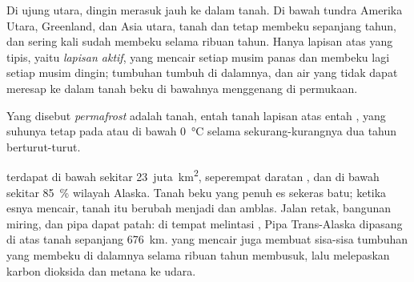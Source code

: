Di ujung utara, dingin merasuk jauh ke dalam tanah. Di bawah tundra
Amerika Utara, Greenland, dan Asia utara, tanah dan  tetap membeku
sepanjang tahun, dan sering kali sudah membeku selama ribuan tahun. Hanya
lapisan atas yang tipis, yaitu \emph{lapisan aktif}, yang mencair setiap
musim panas dan membeku lagi setiap musim dingin; tumbuhan tumbuh di
dalamnya, dan air yang tidak dapat meresap ke dalam tanah beku di
bawahnya menggenang di permukaan.

\begin{definition}[Permafrost]\label{def:g8:ice-on-earth:permafrost}
Yang disebut \emph{permafrost} adalah tanah, entah
tanah lapisan atas entah , yang suhunya tetap pada atau di bawah
\qty{0}{\degreeCelsius} selama sekurang-kurangnya dua tahun berturut-turut.
\end{definition}

 terdapat di bawah sekitar \num{23}~juta~\unit{km^2}, seperempat
daratan , dan di bawah sekitar 85~\% wilayah Alaska.
Tanah beku yang penuh es sekeras batu; ketika esnya mencair, tanah itu
berubah menjadi  dan amblas. Jalan retak, bangunan miring, dan pipa
dapat patah: di tempat melintasi , Pipa Trans-Alaska dipasang di
atas tanah sepanjang \qty{676}{km}.  yang mencair juga membuat
sisa-sisa tumbuhan yang membeku di dalamnya selama ribuan tahun membusuk,
lalu melepaskan karbon dioksida dan metana ke udara.

